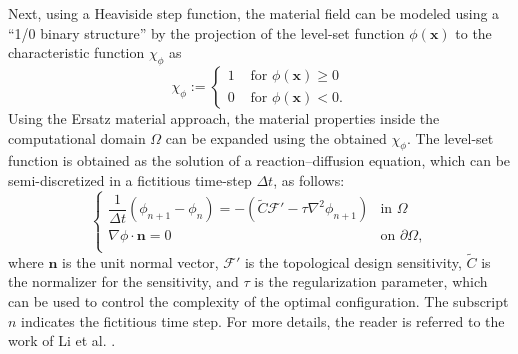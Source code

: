 \begin{subappendices}
Next, using a Heaviside step function, the material field can be modeled using a ``1/0 binary structure'' by the projection of the level-set function $\phi(\mathbf{x})$ to the characteristic function $\chi_{\phi}$ as
\begin{equation}
	\chi_{\phi} :=\left\{\begin{array}{ll}
		{1} & {\text { for } \phi\left( \boldsymbol{x} \right) \geq 0} \\
		{0} & {\text { for } \phi\left( \boldsymbol{x} \right)<0}.
		\label{eq: characteristic function}
	\end{array}\right.
\end{equation}
Using the Ersatz material approach, the material properties inside the computational domain $\Omega$ can be expanded using the obtained $\chi_{\phi}$. The level-set function is obtained as the solution of a reaction--diffusion equation, which can be semi-discretized in a fictitious time-step $\Delta t$, as follows:
\begin{equation}
	\left\{\begin{array}{ll}
		\dfrac{1}{\Delta t} \left( \phi_{n+1} - \phi_{n} \right) =- \left( \tilde{C} \mathcal{F}' -\tau \nabla^{2} \phi_{n+1} \right) & \text{in }\Omega\\
		\nabla \phi \cdot \boldsymbol{n} = 0 & \text{on } \partial\Omega, \\
	\end{array}\right.
	\label{eq: reaction diffusion equation semi discretize}
\end{equation}
where $\boldsymbol{n}$ is the unit normal vector, $\mathcal{F}'$ is the topological design sensitivity, $\tilde{C}$ is the normalizer for the sensitivity, and $\tau$ is the regularization parameter, which can be used to control the complexity of the optimal configuration. The subscript $n$ indicates the fictitious time step. For more details, the reader is referred to the work of Li et al. \cite{li2021full}.


\end{subappendices}
